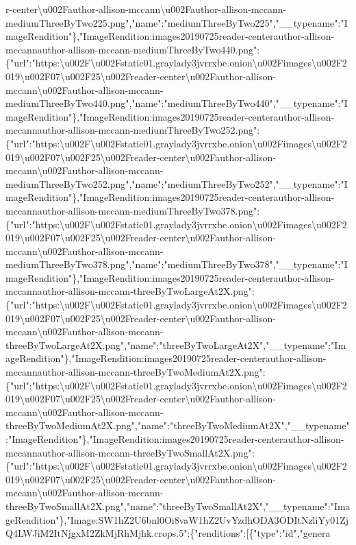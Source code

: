 r-center\textbackslash{}u002Fauthor-allison-mccann\textbackslash{}u002Fauthor-allison-mccann-mediumThreeByTwo225.png","name":"mediumThreeByTwo225","\_\_typename":"ImageRendition"\},"ImageRendition:images20190725reader-centerauthor-allison-mccannauthor-allison-mccann-mediumThreeByTwo440.png":\{"url":"https:\textbackslash{}u002F\textbackslash{}u002Fstatic01.graylady3jvrrxbe.onion\textbackslash{}u002Fimages\textbackslash{}u002F2019\textbackslash{}u002F07\textbackslash{}u002F25\textbackslash{}u002Freader-center\textbackslash{}u002Fauthor-allison-mccann\textbackslash{}u002Fauthor-allison-mccann-mediumThreeByTwo440.png","name":"mediumThreeByTwo440","\_\_typename":"ImageRendition"\},"ImageRendition:images20190725reader-centerauthor-allison-mccannauthor-allison-mccann-mediumThreeByTwo252.png":\{"url":"https:\textbackslash{}u002F\textbackslash{}u002Fstatic01.graylady3jvrrxbe.onion\textbackslash{}u002Fimages\textbackslash{}u002F2019\textbackslash{}u002F07\textbackslash{}u002F25\textbackslash{}u002Freader-center\textbackslash{}u002Fauthor-allison-mccann\textbackslash{}u002Fauthor-allison-mccann-mediumThreeByTwo252.png","name":"mediumThreeByTwo252","\_\_typename":"ImageRendition"\},"ImageRendition:images20190725reader-centerauthor-allison-mccannauthor-allison-mccann-mediumThreeByTwo378.png":\{"url":"https:\textbackslash{}u002F\textbackslash{}u002Fstatic01.graylady3jvrrxbe.onion\textbackslash{}u002Fimages\textbackslash{}u002F2019\textbackslash{}u002F07\textbackslash{}u002F25\textbackslash{}u002Freader-center\textbackslash{}u002Fauthor-allison-mccann\textbackslash{}u002Fauthor-allison-mccann-mediumThreeByTwo378.png","name":"mediumThreeByTwo378","\_\_typename":"ImageRendition"\},"ImageRendition:images20190725reader-centerauthor-allison-mccannauthor-allison-mccann-threeByTwoLargeAt2X.png":\{"url":"https:\textbackslash{}u002F\textbackslash{}u002Fstatic01.graylady3jvrrxbe.onion\textbackslash{}u002Fimages\textbackslash{}u002F2019\textbackslash{}u002F07\textbackslash{}u002F25\textbackslash{}u002Freader-center\textbackslash{}u002Fauthor-allison-mccann\textbackslash{}u002Fauthor-allison-mccann-threeByTwoLargeAt2X.png","name":"threeByTwoLargeAt2X","\_\_typename":"ImageRendition"\},"ImageRendition:images20190725reader-centerauthor-allison-mccannauthor-allison-mccann-threeByTwoMediumAt2X.png":\{"url":"https:\textbackslash{}u002F\textbackslash{}u002Fstatic01.graylady3jvrrxbe.onion\textbackslash{}u002Fimages\textbackslash{}u002F2019\textbackslash{}u002F07\textbackslash{}u002F25\textbackslash{}u002Freader-center\textbackslash{}u002Fauthor-allison-mccann\textbackslash{}u002Fauthor-allison-mccann-threeByTwoMediumAt2X.png","name":"threeByTwoMediumAt2X","\_\_typename":"ImageRendition"\},"ImageRendition:images20190725reader-centerauthor-allison-mccannauthor-allison-mccann-threeByTwoSmallAt2X.png":\{"url":"https:\textbackslash{}u002F\textbackslash{}u002Fstatic01.graylady3jvrrxbe.onion\textbackslash{}u002Fimages\textbackslash{}u002F2019\textbackslash{}u002F07\textbackslash{}u002F25\textbackslash{}u002Freader-center\textbackslash{}u002Fauthor-allison-mccann\textbackslash{}u002Fauthor-allison-mccann-threeByTwoSmallAt2X.png","name":"threeByTwoSmallAt2X","\_\_typename":"ImageRendition"\},"Image:SW1hZ2U6bnl0Oi8vaW1hZ2UvYzdhODA3ODItNzliYy01ZjQ4LWJiM2ItNjgxM2ZkMjRhMjhk.crops.5":\{"renditions":{[}\{"type":"id","genera